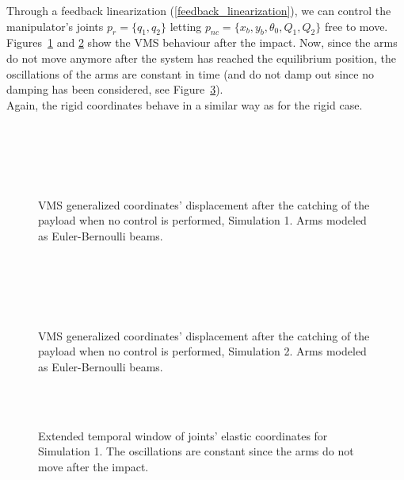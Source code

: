 \documentclass[a4paper,12pt,oneside]{report}
\begin{document}
Through a feedback linearization (\ref{feedback_linearization}), we can control the manipulator's joints $p_r=\{q_1,q_2\}$ letting $p_{nc}=\{x_b,y_b,\theta_0,Q_1,Q_2\}$ free to move.\\
Figures~\ref{contolled_elastic_1} and \ref{controlled_elastic_2} show the VMS behaviour after the impact. Now, since the arms do not move anymore after the system has reached the equilibrium position, the oscillations of the arms are constant in time (and do not damp out since no damping has been considered, see Figure~\ref{no_beat}).\\
Again, the rigid coordinates behave in a similar way as for the rigid case.
\begin{figure}[h]
  \centering
  \subfloat{} \quad
  \subfloat{}\\
  \subfloat{}\\
  \subfloat{}\quad
  \subfloat{}\\
  \subfloat{}\quad
  \subfloat{}\\
  \caption{VMS generalized coordinates’ displacement after the catching of the payload
  when no control is performed, Simulation 1. Arms modeled as Euler-Bernoulli beams.}
  \label{contolled_elastic_1}
\end{figure}
\begin{figure}[h]
  \centering
  \subfloat{} \quad
  \subfloat{}\\
  \subfloat{}\\
  \subfloat{}\quad
  \subfloat{}\\
  \subfloat{}\quad
  \subfloat{}\\
  \caption{VMS generalized coordinates’ displacement after the catching of the payload
  when no control is performed, Simulation 2. Arms modeled as Euler-Bernoulli beams.}
  \label{controlled_elastic_2}
\end{figure}
\begin{figure}
  \centering
  \\
  \\
  \caption{Extended temporal window of joints' elastic coordinates for Simulation 1. The oscillations are constant since the arms do not move after the impact.}
  \label{no_beat}
\end{figure}
\end{document}
